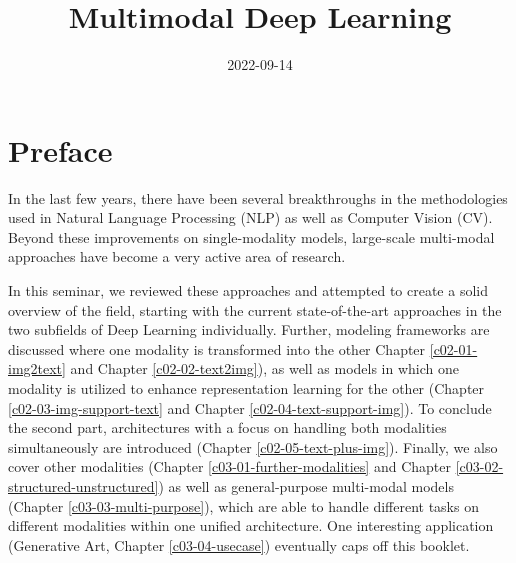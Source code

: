 \documentclass[
]{krantz}
\title{Multimodal Deep Learning}
\author{}
\date{\vspace{-2.5em}2022-09-14}
\begin{document}
\maketitle


\thispagestyle{empty}

\begin{center}
\end{center}

\setlength{\abovedisplayskip}{-5pt}
\setlength{\abovedisplayshortskip}{-5pt}

{
\hypersetup{linkcolor=}
\setcounter{tocdepth}{1}
\tableofcontents
}
\hypertarget{preface}{%
\chapter*{Preface}\label{preface}}


In the last few years, there have been several breakthroughs in the methodologies used in Natural Language Processing (NLP) as well as Computer Vision (CV). Beyond these improvements on single-modality models, large-scale multi-modal approaches have become a very active area of research.

In this seminar, we reviewed these approaches and attempted to create a solid overview of the field, starting with the current state-of-the-art approaches in the two subfields of Deep Learning individually. Further, modeling frameworks are discussed where one modality is transformed into the other Chapter \ref{c02-01-img2text} and Chapter \ref{c02-02-text2img}), as well as models in which one modality is utilized to enhance representation learning for the other (Chapter \ref{c02-03-img-support-text} and Chapter \ref{c02-04-text-support-img}). To conclude the second part, architectures with a focus on handling both modalities simultaneously are introduced (Chapter \ref{c02-05-text-plus-img}). Finally, we also cover other modalities (Chapter \ref{c03-01-further-modalities} and Chapter \ref{c03-02-structured-unstructured}) as well as general-purpose multi-modal models (Chapter \ref{c03-03-multi-purpose}), which are able to handle different tasks on different modalities within one unified architecture. One interesting application (Generative Art, Chapter \ref{c03-04-usecase}) eventually caps off this booklet.
\end{document}
